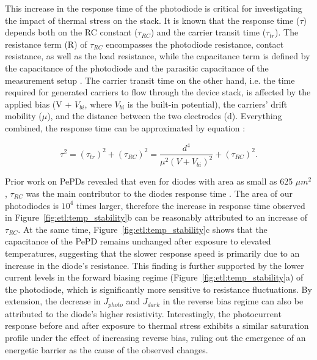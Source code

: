 This increase in the response time of the photodiode is critical for investigating the impact of thermal stress on the stack. It is known that the response time ($\tau$) depends both on the RC constant ($\tau_{RC}$) and the carrier transit time ($\tau_{tr}$). The resistance term (R) of $\tau_{RC}$ encompasses the photodiode resistance, contact resistance, as well as the load resistance, while the capacitance term is defined by the capacitance of the photodiode and the parasitic capacitance of the measurement setup \cite{Shen2016ADetection}. The carrier transit time on the other hand, i.e. the time required for generated carriers to flow through the device stack, is affected by the applied bias (V + $V_{bi}$, where $V_{bi}$ is the built-in potential), the carriers' drift mobility ($\mu$), and the distance between the two electrodes (d). Everything combined, the response time can be approximated by equation \cite{MortezaNajarian2022Sub-millimetrePerovskites}: 

\begin{equation}
    \tau^2 = (\tau_{tr})^2 + (\tau_{RC})^2 = \frac{d^4}{\mu ^2(V + V_{bi})^2} + (\tau_{RC})^2.
\end{equation}

Prior work on PePDs revealed that even for diodes with area as small as 625 $\mu m^2$, $\tau_{RC}$ was the main contributor to the diodes response time \cite{Song2024HalideImager}. The area of our photodiodes is $10^4$ times larger, therefore the increase in response time observed in Figure~\ref{fig:etl:temp_stability}b can be reasonably attributed to an increase of $\tau_{RC}$. At the same time, Figure~\ref{fig:etl:temp_stability}c shows that the capacitance of the PePD remains unchanged after exposure to elevated temperatures, suggesting that the slower response speed is primarily due to an increase in the diode's resistance. This finding is further supported by the lower current levels in the forward biasing regime (Figure~\ref{fig:etl:temp_stability}a) of the photodiode, which is significantly more sensitive to resistance fluctuations. By extension, the decrease in $J_{photo}$ and $J_{dark}$ in the reverse bias regime can also be attributed to the diode's higher resistivity. Interestingly, the photocurrent response before and after exposure to thermal stress exhibits a similar saturation profile under the effect of increasing reverse bias, ruling out the emergence of an energetic barrier as the cause of the observed changes.

